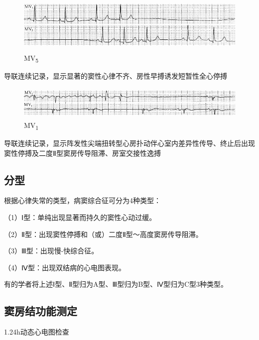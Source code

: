 \begin{figure}[!htbp]
 \centering
 \includegraphics[width=5.58333in,height=1.09375in]{./images/Image00459.jpg}
 \captionsetup{justification=centering}
 \caption{MV\textsubscript{5}}
 \label{fig27-4}
  \end{figure} 
导联连续记录，显示显著的窦性心律不齐、房性早搏诱发短暂性全心停搏

\begin{figure}[!htbp]
 \centering
 \includegraphics[width=5.58333in,height=0.63542in]{./images/Image00460.jpg}
 \captionsetup{justification=centering}
 \caption{MV\textsubscript{1}}
 \label{fig27-5}
  \end{figure} 
导联连续记录，显示阵发性尖端扭转型心房扑动伴心室内差异性传导、终止后出现窦性停搏及二度Ⅱ型窦房传导阻滞、房室交接性逸搏

\protect\hypertarget{text00034.htmlux5cux23subid411}{}{}

\subsection{分型}

根据心律失常的类型，病窦综合征可分为4种类型：

（1）Ⅰ型：单纯出现显著而持久的窦性心动过缓。

（2）Ⅱ型：出现窦性停搏和（或）二度Ⅱ型～高度窦房传导阻滞。

（3）Ⅲ型：出现慢-快综合征。

（4）Ⅳ型：出现双结病的心电图表现。

有的学者将上述Ⅰ型、Ⅱ型归为A型、Ⅲ型归为B型、Ⅳ型归为C型3种类型。

\protect\hypertarget{text00034.htmlux5cux23subid412}{}{}

\subsection{窦房结功能测定}

1.24h动态心电图检查

